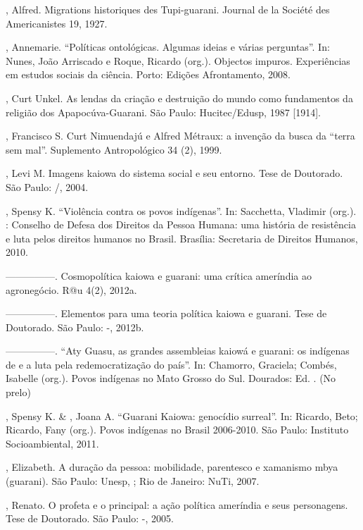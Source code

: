 \begin{Parskip}
, Alfred. Migrations historiques des Tupi-guarani. Journal
de la Société des Americanistes 19, 1927.

, Annemarie. ``Políticas ontológicas. Algumas ideias e várias
perguntas''. In: Nunes, João Arriscado e Roque, Ricardo (org.). Objectos
impuros. Experiências em estudos sociais da ciência. Porto: Edições
Afrontamento, 2008.

, Curt Unkel. As lendas da criação e destruição do mundo
como fundamentos da religião dos Apapocúva-Guarani. São Paulo:
Hucitec/Edusp, 1987 [1914].

, Francisco S. Curt Nimuendajú e Alfred Métraux: a invenção
da busca da ``terra sem mal''. Suplemento Antropológico 34 (2), 1999. 

, Levi M. Imagens kaiowa do sistema social e seu entorno.
Tese de Doutorado. São Paulo: /, 2004.

, Spensy K. ``Violência contra os povos indígenas''. In:
Sacchetta, Vladimir (org.). : Conselho de Defesa dos Direitos da
Pessoa Humana: uma história de resistência e luta pelos direitos
humanos no Brasil. Brasília: Secretaria de Direitos Humanos, 2010.

—————. Cosmopolítica kaiowa e guarani: uma crítica ameríndia ao
agronegócio. R@u 4(2), 2012a.

—————. Elementos para uma teoria política kaiowa e guarani. Tese
de Doutorado. São Paulo: -, 2012b. 

—————. ``Aty Guasu, as grandes assembleias kaiowá e guarani: os
indígenas de  e a luta pela redemocratização do país''. In: Chamorro,
Graciela; Combés, Isabelle (org.). Povos indígenas no Mato Grosso do
Sul. Dourados: Ed. . (No prelo)

, Spensy K. \& , Joana A. ``Guarani Kaiowa: genocídio
surreal''. In: Ricardo, Beto; Ricardo, Fany (org.). Povos indígenas no
Brasil 2006-2010. São Paulo: Instituto Socioambiental, 2011.

, Elizabeth. A duração da pessoa: mobilidade, parentesco
e xamanismo mbya (guarani). São Paulo: Unesp, ; Rio de Janeiro:
NuTi, 2007.

, Renato. O profeta e o principal: a ação política
ameríndia e seus personagens. Tese de Doutorado. São Paulo: -,
2005.


\end{Parskip}
